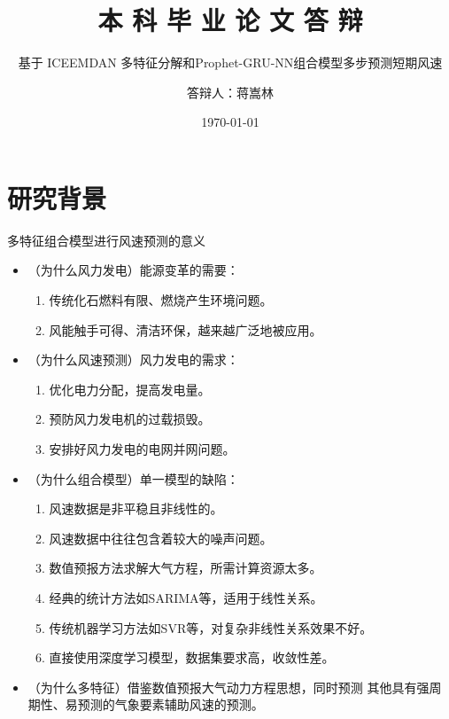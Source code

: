 \documentclass[14pt, AutoFakeBold]{ppt}
\title{本 科 毕 业 论 文 答 辩}
\subtitle{基于 ICEEMDAN 多特征分解和Prophet-GRU-NN组合模型多步预测短期风速}
\author{答辩人：蒋嵩林}
\institute{指导老师：任超 副教授}
\date{\today}
\begin{document}
\maketitle


\section{研究背景}


\begin{frame}[c]{多特征组合模型进行风速预测的意义}
  \begin{itemize}
    \item （为什么风力发电）能源变革的需要：
    \begin{enumerate}
      \item 传统化石燃料有限、燃烧产生环境问题。
      \item 风能触手可得、清洁环保，越来越广泛地被应用。
    \end{enumerate}

    \item （为什么风速预测）风力发电的需求：
    \begin{enumerate}
      \item 优化电力分配，提高发电量。
      \item 预防风力发电机的过载损毁。
      \item 安排好风力发电的电网并网问题。
    \end{enumerate}

    \item （为什么组合模型）单一模型的缺陷：
    \begin{enumerate}
      \item 风速数据是非平稳且非线性的。
      \item 风速数据中往往包含着较大的噪声问题。
      \item 数值预报方法求解大气方程，所需计算资源太多。
      \item 经典的统计方法如SARIMA等，适用于线性关系。
      \item 传统机器学习方法如SVR等，对复杂非线性关系效果不好。
      \item 直接使用深度学习模型，数据集要求高，收敛性差。
    \end{enumerate}

    \item （为什么多特征）借鉴数值预报大气动力方程思想，同时预测
    其他具有强周期性、易预测的气象要素辅助风速的预测。
  \end{itemize}
\end{frame}
\end{document}
